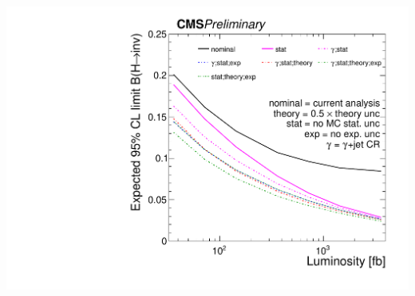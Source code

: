 \documentclass[aspectratio=169,xcolor=dvipsnames,,table,compress]{beamer}
\begin{document}
\begin{frame}
\begin{columns}[T]
\begin{column}{0.33\textwidth}
      \includegraphics[width=\textwidth]{../figures/vbf/projection/projection_compare_3.pdf}
    \end{column}
  \end{columns}
\end{frame}

\backupbegin





\backupend
\end{document}
